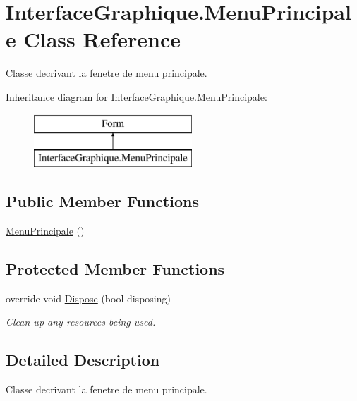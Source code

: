 \hypertarget{class_interface_graphique_1_1_menu_principale}{}\section{Interface\+Graphique.\+Menu\+Principale Class Reference}
\label{class_interface_graphique_1_1_menu_principale}


Classe decrivant la fenetre de menu principale.  


Inheritance diagram for Interface\+Graphique.\+Menu\+Principale\+:\begin{figure}[H]
\begin{center}
\leavevmode
\includegraphics[height=2.000000cm]{class_interface_graphique_1_1_menu_principale}
\end{center}
\end{figure}
\subsection*{Public Member Functions}
\begin{DoxyCompactItemize}
\item 
\hyperlink{group__inf2990_gaa576ec13d34d312b71a63a4c42091776}{Menu\+Principale} ()
\end{DoxyCompactItemize}
\subsection*{Protected Member Functions}
\begin{DoxyCompactItemize}
\item 
override void \hyperlink{class_interface_graphique_1_1_menu_principale_ad4c8e7dccf5eec2b510b759e641f6269}{Dispose} (bool disposing)
\begin{DoxyCompactList}\small\item\em Clean up any resources being used. \end{DoxyCompactList}\end{DoxyCompactItemize}


\subsection{Detailed Description}
Classe decrivant la fenetre de menu principale. 


